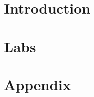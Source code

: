 \documentclass[12pt,twoside]{report}
\begin{document}
    
    \newpage
    
    
    \newpage
    
    \chapter{Introduction}
    

    \chapter{Labs}
    

    \appendix
    \chapter{Appendix}
    
\end{document}
